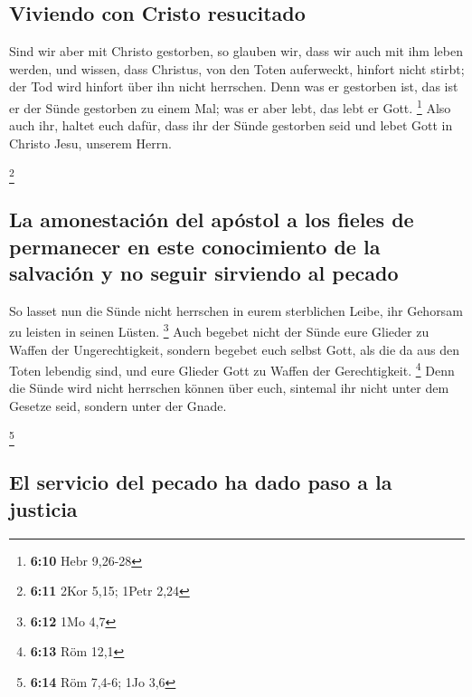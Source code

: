 \hypertarget{viviendo-con-cristo-resucitado}{%
\subsection{Viviendo con Cristo
resucitado}\label{viviendo-con-cristo-resucitado}}

 Sind wir aber mit Christo gestorben, so glauben wir, dass
wir auch mit ihm leben werden,  und wissen, dass Christus,
von den Toten auferweckt, hinfort nicht stirbt; der Tod wird hinfort
über ihn nicht herrschen.  Denn was er gestorben ist, das
ist er der Sünde gestorben zu einem Mal; was er aber lebt, das lebt er
Gott. \footnote{\textbf{6:10} Hebr 9,26-28}  Also auch
ihr, haltet euch dafür, dass ihr der Sünde gestorben seid und lebet Gott
in Christo Jesu, unserem Herrn.

\footnote{\textbf{6:11} 2Kor 5,15; 1Petr 2,24}

\hypertarget{la-amonestaciuxf3n-del-apuxf3stol-a-los-fieles-de-permanecer-en-este-conocimiento-de-la-salvaciuxf3n-y-no-seguir-sirviendo-al-pecado}{%
\subsection{La amonestación del apóstol a los fieles de permanecer en
este conocimiento de la salvación y no seguir sirviendo al
pecado}\label{la-amonestaciuxf3n-del-apuxf3stol-a-los-fieles-de-permanecer-en-este-conocimiento-de-la-salvaciuxf3n-y-no-seguir-sirviendo-al-pecado}}

 So lasset nun die Sünde nicht herrschen in eurem
sterblichen Leibe, ihr Gehorsam zu leisten in seinen Lüsten. \footnote{\textbf{6:12}
  1Mo 4,7}  Auch begebet nicht der Sünde eure Glieder zu
Waffen der Ungerechtigkeit, sondern begebet euch selbst Gott, als die da
aus den Toten lebendig sind, und eure Glieder Gott zu Waffen der
Gerechtigkeit. \footnote{\textbf{6:13} Röm 12,1}  Denn
die Sünde wird nicht herrschen können über euch, sintemal ihr nicht
unter dem Gesetze seid, sondern unter der Gnade.

\footnote{\textbf{6:14} Röm 7,4-6; 1Jo 3,6}

\hypertarget{el-servicio-del-pecado-ha-dado-paso-a-la-justicia}{%
\subsection{El servicio del pecado ha dado paso a la
justicia}\label{el-servicio-del-pecado-ha-dado-paso-a-la-justicia}}

